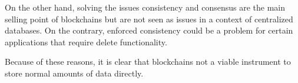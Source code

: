 \iffalse
- because in a context of centralized database, consistency and consensus as are not issues. Solving these problems is the main selling point of blockchain. Although it might be interesting that blockchain provides consistency, this could also be a problem. Some centralized databases might require delete functionality. This is no possible when using a blockchain

- not viable for storage of normal amounts of data
\fi

On the other hand, solving the issues consistency and consensus are the main selling point of blockchains but are not seen as issues in a context of centralized databases. On the contrary, enforced consistency could be a problem for certain applications that require delete functionality.

Because of these reasons, it is clear that blockchains not a viable instrument to store normal amounts of data directly.